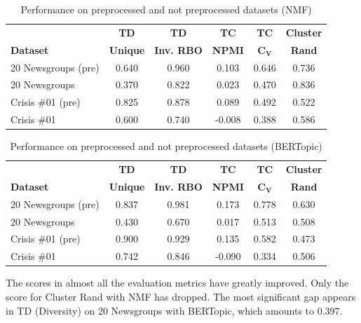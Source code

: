 \documentclass[11pt]{article}
\begin{document}
\begin{table}[ht]
\centering
\begin{adjustbox}{width=0.5\textwidth}
\begin{tabular}{lccccc}
\hline
\textbf{} & \textbf{TD} & \textbf{TD} & \textbf{TC} & \textbf{TC} & \textbf{Cluster}\\
\textbf{Dataset} & \textbf{Unique} & \textbf{Inv. RBO} & \textbf{NPMI} & \textbf{C${_\mathbf{V}}$} & \textbf{Rand}\\
\hline
20 Newsgroups (pre) & 0.640 & 0.960 & 0.103 & 0.646 & 0.736\\ 
20 Newsgroups & 0.370 & 0.822 & 0.023 & 0.470 & 0.836\\
\hline
Crisis \#01 (pre) & 0.825 & 0.878 & 0.089 & 0.492 & 0.522\\
Crisis \#01 & 0.600 & 0.740 & -0.008 & 0.388 & 0.586\\
\hline
\end{tabular}
\end{adjustbox}
\caption{Performance on preprocessed and not preprocessed datasets (NMF)}
\label{tab:pre and not pre datasets nmf}
\end{table}

\begin{table}[ht]
\centering
\begin{adjustbox}{width=0.5\textwidth}
\begin{tabular}{lccccc}
\hline
\textbf{} & \textbf{TD} & \textbf{TD} & \textbf{TC} & \textbf{TC} & \textbf{Cluster}\\
\textbf{Dataset} & \textbf{Unique} & \textbf{Inv. RBO} & \textbf{NPMI} & \textbf{C${_\mathbf{V}}$} & \textbf{Rand}\\
\hline
20 Newsgroups (pre) & 0.837 & 0.981 & 0.173 & 0.778 & 0.630\\ 
20 Newsgroups & 0.430 & 0.670 & 0.017 & 0.513 & 0.508\\
\hline
Crisis \#01 (pre) & 0.900 & 0.929 & 0.135 & 0.582 & 0.473\\
Crisis \#01 & 0.742 & 0.846 & -0.090 & 0.334 & 0.506\\
\hline
\end{tabular}
\end{adjustbox}
\caption{Performance on preprocessed and not preprocessed datasets (BERTopic)}
\label{tab:pre and not pre datasets BERTopic}
\end{table}

The scores in almost all the evaluation metrics have greatly improved. Only the score for Cluster Rand with NMF has dropped. The most significant gap appears in TD (Diversity) on 20 Newsgroups with BERTopic, which amounts to 0.397.
\end{document}
